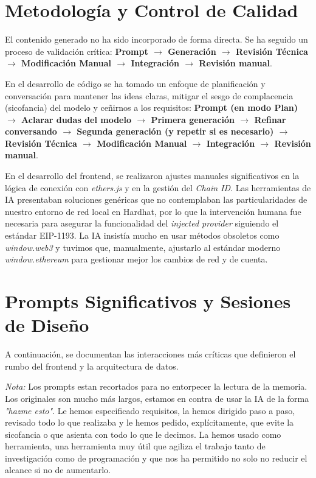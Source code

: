 \section{Metodología y Control de Calidad}
El contenido generado no ha sido incorporado de forma directa. Se ha seguido un proceso de validación 
crítica: \textbf{Prompt $\rightarrow$ Generación $\rightarrow$ Revisión Técnica $\rightarrow$ Modificación Manual $\rightarrow$ Integración $\rightarrow$ Revisión manual}. 

En el desarrollo de código se ha tomado un enfoque de planificación y conversación para mantener las 
ideas claras, mitigar el sesgo de complacencia (sicofancia) del modelo y ceñirnos a los requisitos: \textbf{Prompt (en modo Plan) 
$\rightarrow$ Aclarar dudas del modelo $\rightarrow$ Primera generación $\rightarrow$ Refinar conversando 
$\rightarrow$ Segunda generación (y repetir si es necesario) $\rightarrow$ Revisión Técnica $\rightarrow$ 
Modificación Manual $\rightarrow$ Integración $\rightarrow$ Revisión manual}. 

En el desarrollo del frontend, se realizaron ajustes manuales significativos en la lógica de conexión con \textit{ethers.js} y en la gestión del \textit{Chain ID}. Las herramientas de IA presentaban soluciones genéricas que no contemplaban las particularidades de nuestro entorno de red local en Hardhat, por lo que la intervención humana fue necesaria para asegurar la funcionalidad del \textit{injected provider} siguiendo el estándar EIP-1193. La IA insistía mucho en usar métodos obsoletos como \textit{window.web3} y tuvimos que, manualmente, ajustarlo al estándar moderno \textit{window.ethereum} para gestionar mejor los cambios de red y de cuenta.

\section{Prompts Significativos y Sesiones de Diseño}
A continuación, se documentan las interacciones más críticas que definieron el rumbo del frontend y la arquitectura de datos.

\textit{Nota:} Los prompts estan recortados para no entorpecer la lectura de la memoria. Los originales son mucho 
más largos, estamos en contra de usar la IA de la forma \textit{"hazme esto"}. Le hemos especificado requisitos, 
la hemos dirigido paso a paso, revisado todo lo que realizaba y le hemos pedido, explícitamente, que evite la 
sicofancia o que asienta con todo lo que le decimos. La hemos usado como herramienta, una herramienta muy útil 
que agiliza el trabajo tanto de investigación como de programación y que nos ha permitido no solo no reducir 
el alcance si no de aumentarlo.

